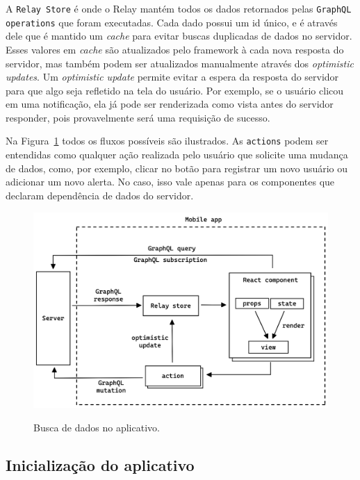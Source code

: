 A \texttt{Relay Store} é onde o Relay mantém todos os dados retornados pelas \texttt{GraphQL operations} que foram executadas. Cada dado possui um id único, e é através dele que é mantido um \emph{cache} para evitar buscas duplicadas de dados no servidor. Esses valores em \emph{cache} são atualizados pelo framework à cada nova resposta do servidor, mas também podem ser atualizados manualmente através dos \emph{optimistic updates}. Um \emph{optimistic update} permite evitar a espera da resposta do servidor para que algo seja refletido na tela do usuário. Por exemplo, se o usuário clicou em uma notificação, ela já pode ser renderizada como vista antes do servidor responder, pois provavelmente será uma requisição de sucesso.

Na Figura~\ref{f.system_app} todos os fluxos possíveis são ilustrados. As \texttt{actions} podem ser entendidas como qualquer ação realizada pelo usuário que solicite uma mudança de dados, como, por exemplo, clicar no botão para registrar um novo usuário ou adicionar um novo alerta. No caso, isso vale apenas para os componentes que declaram dependência de dados do servidor.

\begin{figure}[htbp]
	\caption{\small Busca de dados no aplicativo.}
	\centering
	\includegraphics[width=\textwidth]{../diagrams/out/system_app.png}
	\label{f.system_app}
\end{figure}

\FloatBarrier

\subsection{Inicialização do aplicativo}

